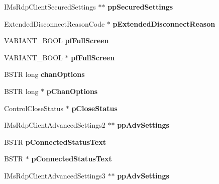 \begin{DoxyCompactItemize}
I\+Ms\+Rdp\+Client\+Secured\+Settings $\ast$$\ast$ {\bfseries pp\+Secured\+Settings}
\item 
\mbox{\label{struct_i_ms_rdp_client3_vtbl_a317fac9d2f416c91ba3340223c57955a}} 
Extended\+Disconnect\+Reason\+Code $\ast$ {\bfseries p\+Extended\+Disconnect\+Reason}
\item 
\mbox{\label{struct_i_ms_rdp_client3_vtbl_accced53b36c6bf469b69927f168a29e1}} 
V\+A\+R\+I\+A\+N\+T\+\_\+\+B\+O\+OL {\bfseries pf\+Full\+Screen}
\item 
\mbox{\label{struct_i_ms_rdp_client3_vtbl_a10292b499513615acc3faaa8e83d8613}} 
V\+A\+R\+I\+A\+N\+T\+\_\+\+B\+O\+OL $\ast$ {\bfseries pf\+Full\+Screen}
\item 
\mbox{\label{struct_i_ms_rdp_client3_vtbl_a8aeadeb3d366016c83c1382fd2918d93}} 
B\+S\+TR long {\bfseries chan\+Options}
\item 
\mbox{\label{struct_i_ms_rdp_client3_vtbl_ac7a3dec5a622e77967372d266ed27eda}} 
B\+S\+TR long $\ast$ {\bfseries p\+Chan\+Options}
\item 
\mbox{\label{struct_i_ms_rdp_client3_vtbl_a9f42fab7ea2f380cabfd248225a692cd}} 
Control\+Close\+Status $\ast$ {\bfseries p\+Close\+Status}
\item 
\mbox{\label{struct_i_ms_rdp_client3_vtbl_a2d16f82eb3fc677366aaff90bb7cc8ee}} 
I\+Ms\+Rdp\+Client\+Advanced\+Settings2 $\ast$$\ast$ {\bfseries pp\+Adv\+Settings}
\item 
\mbox{\label{struct_i_ms_rdp_client3_vtbl_a83fb6531fc6b15027bffb0b361359068}} 
B\+S\+TR {\bfseries p\+Connected\+Status\+Text}
\item 
\mbox{\label{struct_i_ms_rdp_client3_vtbl_ae1f3cb441a1c01254a59e97f93261e56}} 
B\+S\+TR $\ast$ {\bfseries p\+Connected\+Status\+Text}
\item 
\mbox{\label{struct_i_ms_rdp_client3_vtbl_a1d27534a1f494a0f86bb5f0624abcd19}} 
I\+Ms\+Rdp\+Client\+Advanced\+Settings3 $\ast$$\ast$ {\bfseries pp\+Adv\+Settings}
\end{DoxyCompactItemize}


